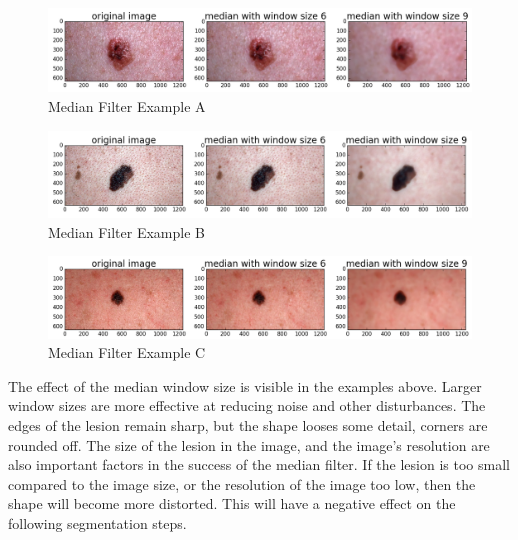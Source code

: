 \begin{figure}[H]
    \includegraphics[width=\textwidth,keepaspectratio]{assets/image_processing/noise_reduction/figure_01.png}
    \caption{Median Filter Example A}
    \label{fig:med_A}
\end{figure}
\begin{figure}[H]
    \includegraphics[width=\textwidth,keepaspectratio]{assets/image_processing/noise_reduction/figure_02.png}
    \caption{Median Filter Example B}
    \label{fig:med_B}
\end{figure}
\begin{figure}[H]
    \includegraphics[width=\textwidth,keepaspectratio]{assets/image_processing/noise_reduction/figure_03.png}
    \caption{Median Filter Example C}
    \label{fig:med_B}
\end{figure}

The effect of the median window size is visible in the examples above. Larger window sizes are more effective at reducing noise and other disturbances. The edges of the lesion remain sharp, but the shape looses some detail, corners are rounded off. The size of the lesion in the image, and the image’s resolution are also important factors in the success of the median filter. If the lesion is too small compared to the image size, or the resolution of the image too low, then the shape will become more distorted. This will have a negative effect on the following segmentation steps.